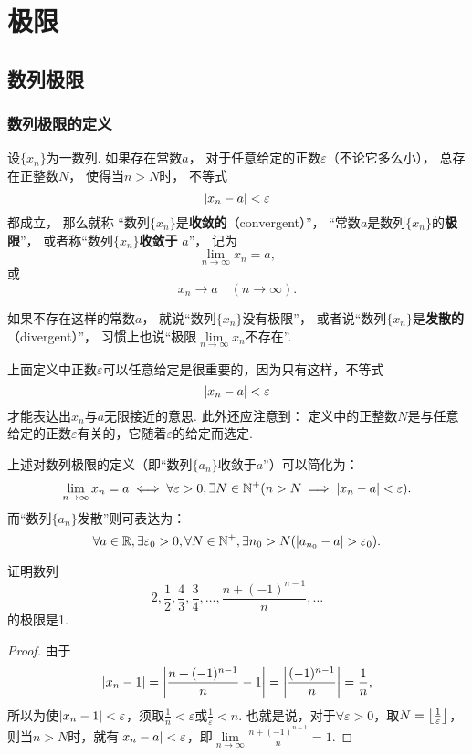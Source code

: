 \chapter{极限}
\section{数列极限}
\subsection{数列极限的定义}
\begin{definition}
设\(\{x_n\}\)为一数列.
如果存在常数\(a\)，%
对于任意给定的正数\(\varepsilon\)（不论它多么小），%
总存在正整数\(N\)，%
使得当\(n > N\)时，%
不等式\[
\abs{x_n - a} < \varepsilon
\]都成立，%
那么就称%
“数列\(\{x_n\}\)是\textbf{收敛的}（convergent）”，%
“常数\(a\)是数列\(\{x_n\}\)的\textbf{极限}”，%
或者称“数列\(\{x_n\}\)\textbf{收敛于} \(a\)”，%
记为\[
\lim\limits_{n\to\infty} x_n = a,
\]或\[
x_n \to a \quad (n \to \infty).
\]

如果不存在这样的常数\(a\)，%
就说“数列\(\{x_n\}\)没有极限”，%
或者说“数列\(\{x_n\}\)是\textbf{发散的}（divergent）”，%
习惯上也说“极限\(\lim\limits_{n\to\infty} x_n\)不存在”.
\end{definition}

上面定义中正数\(\varepsilon\)可以任意给定是很重要的，因为只有这样，不等式\[
\abs{x_n - a} < \varepsilon
\]才能表达出\(x_n\)与\(a\)无限接近的意思.
此外还应注意到：
定义中的正整数\(N\)是与任意给定的正数\(\varepsilon\)有关的，它随着\(\varepsilon\)的给定而选定.

上述对数列极限的定义（即“数列\(\{a_n\}\)收敛于\(a\)”）可以简化为：\[
	\lim\limits_{n\to\infty} x_n = a
	\iff
	\forall \varepsilon > 0,
	\exists N\in\mathbb{N}^+ (n > N \implies \abs{x_n - a} < \varepsilon).
\]
而“数列\(\{a_n\}\)发散”则可表达为：\[
	\forall a \in \mathbb{R},
	\exists \varepsilon_0 > 0,
	\forall N \in \mathbb{N}^+,
	\exists n_0 > N
	(
		\abs{a_{n_0} - a} > \varepsilon_0
	).
\]


\begin{example}
证明数列\[
2,\frac{1}{2},\frac{4}{3},\frac{3}{4},\dotsc,\frac{n+(-1)^{n-1}}{n},\dotsc
\]的极限是1.
\begin{proof}
由于\[
\abs{x_n - 1}
= \abs{\frac{n+(-1)^{n-1}}{n}-1}
= \abs{\frac{(-1)^{n-1}}{n}}
= \frac{1}{n},
\]所以为使\(\abs{x_n - 1} < \varepsilon\)，须取\(\frac{1}{n} < \varepsilon\)或\(\frac{1}{\varepsilon} < n\).
也就是说，对于\(\forall \varepsilon > 0\)，取\(N = \floor*{\frac{1}{\varepsilon}}\)，则当\(n > N\)时，就有\(\abs{x_n - a} < \varepsilon\)，即\(\lim\limits_{n\to\infty}\frac{n+(-1)^{n-1}}{n}=1\).
\end{proof}
\end{example}

